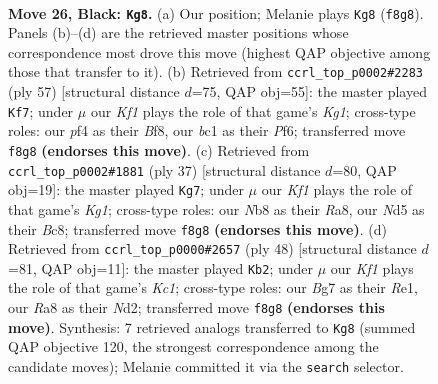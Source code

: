 \documentclass[11pt]{article}
\begin{document}
\clearpage

\begin{figure}[p]\centering
\begin{subfigure}{0.46\textwidth}\centering
\resizebox{\linewidth}{!}{%
\newchessgame
\chessboard[
  setfen={rn3k2/p1r3bp/Pp3p2/1P1nNR2/4pPP1/8/4B3/R1B1K3 b Q - 1 26},
  showmover=false,
  pgfstyle=straightmove, color=movearrow, markmove={f8-g8}
]}
\caption{}
\end{subfigure}\hfill
\begin{subfigure}{0.46\textwidth}\centering
\resizebox{\linewidth}{!}{%
\newchessgame
\chessboard[
  setfen={3r1bk1/1r4p1/p4p2/2nNp3/1Bp1P2R/P7/1PP3P1/2KR4 b - - 5 29},
  showmover=false,
  pgfstyle=straightmove, color=movearrow, markmove={g8-f7}
]}
\caption{}
\end{subfigure}
\\[4pt]
\begin{subfigure}{0.46\textwidth}\centering
\resizebox{\linewidth}{!}{%
\newchessgame
\chessboard[
  setfen={r1b2rk1/5p2/2R1pn1p/p5p1/4p1PP/2N3P1/PPP1B3/2K4R b - - 0 19},
  showmover=false,
  pgfstyle=straightmove, color=movearrow, markmove={g8-g7}
]}
\caption{}
\end{subfigure}\hfill
\begin{subfigure}{0.46\textwidth}\centering
\resizebox{\linewidth}{!}{%
\newchessgame
\chessboard[
  setfen={4r2r/ppkn4/2p2pb1/P5pp/3PP3/2P2BP1/3N2P1/2K1R2R w - - 5 25},
  showmover=false,
  pgfstyle=straightmove, color=movearrow, markmove={c1-b2}
]}
\caption{}
\end{subfigure}
\caption{\textbf{Move 26, Black: \texttt{Kg8}.} (a) Our position; Melanie plays \texttt{Kg8} (\texttt{f8g8}). Panels (b)--(d) are the retrieved master positions whose correspondence most drove this move (highest QAP objective among those that transfer to it). (b) Retrieved from \texttt{ccrl\_top\_p0002\#2283} (ply 57) [structural distance $d$=75, QAP obj=55]: the master played \texttt{Kf7}; under $\mu$ our \emph{Kf1} plays the role of that game's \emph{Kg1}; cross-type roles: our \emph{p}f4 as their \emph{B}f8, our \emph{b}c1 as their \emph{P}f6; transferred move \texttt{f8g8} \textbf{(endorses this move)}. (c) Retrieved from \texttt{ccrl\_top\_p0002\#1881} (ply 37) [structural distance $d$=80, QAP obj=19]: the master played \texttt{Kg7}; under $\mu$ our \emph{Kf1} plays the role of that game's \emph{Kg1}; cross-type roles: our \emph{N}b8 as their \emph{R}a8, our \emph{N}d5 as their \emph{B}c8; transferred move \texttt{f8g8} \textbf{(endorses this move)}. (d) Retrieved from \texttt{ccrl\_top\_p0000\#2657} (ply 48) [structural distance $d$=81, QAP obj=11]: the master played \texttt{Kb2}; under $\mu$ our \emph{Kf1} plays the role of that game's \emph{Kc1}; cross-type roles: our \emph{B}g7 as their \emph{R}e1, our \emph{R}a8 as their \emph{N}d2; transferred move \texttt{f8g8} \textbf{(endorses this move)}. Synthesis: 7 retrieved analogs transferred to \texttt{Kg8} (summed QAP objective 120, the strongest correspondence among the candidate moves); Melanie committed it via the \texttt{search} selector.}
\label{fig:thought-m51}
\end{figure}
\end{document}
